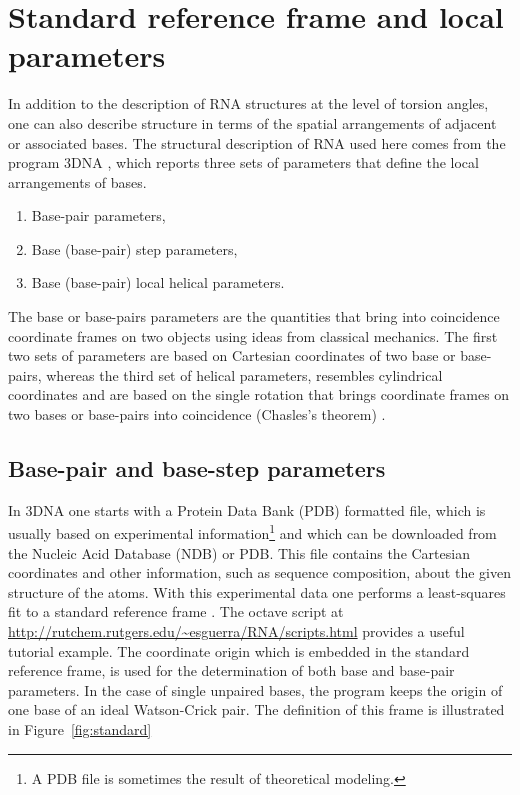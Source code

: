 \chapter{Standard reference frame and local parameters}
\label{appendix_1a}
  In   addition  to  the   description  of  RNA
structures  at the  level of  torsion  angles, one  can also  describe
structure  in  terms  of  the  spatial  arrangements  of  adjacent  or
associated bases.  The structural description  of RNA used  here comes
from the program \textsf{3DNA} \cite{lu2003}, which reports three sets
of parameters that define the local arrangements of bases.
\begin{enumerate}
\item Base-pair parameters,
\item Base (base-pair) step parameters,
\item Base (base-pair) local helical parameters.
\end{enumerate}
The base or  base-pairs parameters are the quantities  that bring into
coincidence  coordinate  frames  on   two  objects  using  ideas  from
classical mechanics.
The first two sets of parameters are based on Cartesian coordinates of
two base or  base-pairs, whereas the third set  of helical parameters,
resembles cylindrical coordinates and are based on the single rotation
that  brings  coordinate  frames  on  two  bases  or  base-pairs  into
coincidence (Chasles's theorem) \cite{babcock1994}.

\section{Base-pair and base-step parameters}
In \textsf{3DNA} one  starts with a Protein Data  Bank (PDB) formatted
\cite{berman2000}  file,  which   is  usually  based  on  experimental
information\footnote{A PDB file is sometimes the result of theoretical
  modeling.}   and  which can  be  downloaded  from  the Nucleic  Acid
Database (NDB)  or PDB.  This file contains  the Cartesian coordinates
and other  information, such as sequence composition,  about the given
structure of  the atoms.  With  this experimental data one  performs a
least-squares fit to a  standard reference frame \cite{olson2001}. The
\textsf{octave}                        script                       at
\url{http://rutchem.rutgers.edu/\~esguerra/RNA/scripts.html}   provides
a useful tutorial example.  The coordinate origin which is embedded in
the standard  reference frame, is  used for the determination  of both
base and base-pair parameters.  In  the case of single unpaired bases,
the  program keeps the  origin of  one base  of an  ideal Watson-Crick
pair.    The   definition   of    this   frame   is   illustrated   in
Figure~\ref{fig:standard}

